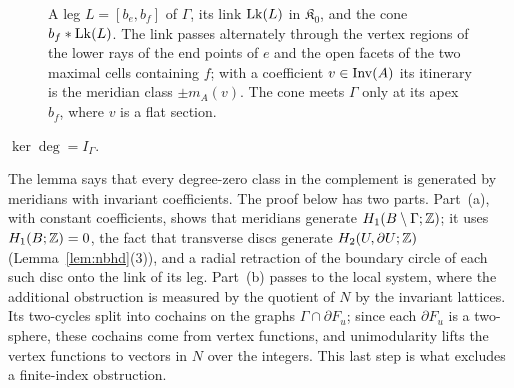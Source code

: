\begin{figure}[ht]
\centering
{}
\caption{A leg $L=[b_e,b_f]$ of $\Gamma$, its link $\operatorname{Lk}(L)$ in $\mathfrak K_0$, and the cone $b_f*\operatorname{Lk}(L)$. The link passes
alternately through the vertex regions of the lower rays of the end points of $e$ and the open facets of the two maximal
cells containing $f$; with a coefficient $v\in\operatorname{Inv}(A)$ its itinerary is the meridian class $\pm m_A(v)$. The cone meets
$\Gamma$ only at its apex $b_f$, where $v$ is a flat section.}\label{fig:meridian}
\end{figure}

\begin{lemma}\label{lem:complement}
$\ker\deg=I_\Gamma$.
\end{lemma}

The lemma says that every degree-zero class in the complement is generated by meridians with invariant coefficients.
The proof below has two parts. Part~(a), with constant coefficients, shows that meridians generate $H_1(B\setminus\Gamma;\mathbb Z)$;
it uses $H_1(B;\mathbb Z)=0$, the fact that transverse discs generate $H_2(U,\partial U;\mathbb Z)$ (Lemma~\ref{lem:nbhd}(3)), and a radial
retraction of the boundary circle of each such disc onto the link of its leg. Part~(b) passes to the local system, where the
additional obstruction is measured by the quotient of $N$ by the invariant lattices. Its two-cycles split into cochains on
the graphs $\Gamma\cap\partial F_u$; since each $\partial F_u$ is a two-sphere, these cochains come from vertex functions, and
unimodularity lifts the vertex functions to vectors in $N$ over the integers. This last step is what excludes a finite-index
obstruction.

